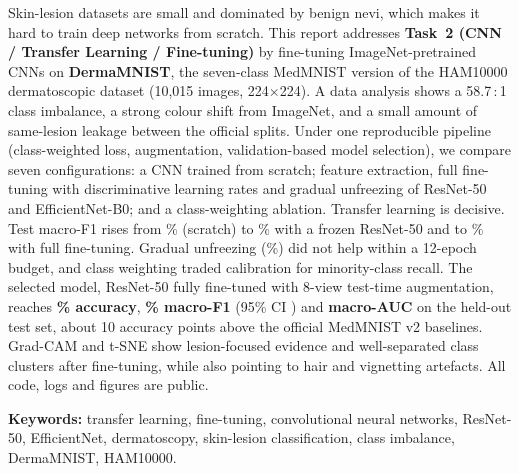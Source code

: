 Skin-lesion datasets are small and dominated by benign nevi, which makes it hard to train deep networks from
scratch. This report addresses \textbf{Task~2 (CNN / Transfer Learning / Fine-tuning)} by fine-tuning
ImageNet-pretrained CNNs on \textbf{DermaMNIST}, the seven-class MedMNIST version of the HAM10000 dermatoscopic
dataset (10{,}015 images, 224$\times$224). A data analysis shows a 58.7\,:\,1 class imbalance, a strong colour
shift from ImageNet, and a small amount of same-lesion leakage between the official splits. Under one
reproducible pipeline (class-weighted loss, augmentation, validation-based model selection), we compare seven
configurations: a CNN trained from scratch; feature extraction, full fine-tuning with discriminative learning
rates and gradual unfreezing of ResNet-50 and EfficientNet-B0; and a class-weighting ablation. Transfer learning
is decisive. Test macro-F1 rises from \ScratchFOne\% (scratch) to \RFrozenFOne\% with a frozen ResNet-50 and to
\RFineFOne\% with full fine-tuning. Gradual unfreezing (\RGradFOne\%) did not help within a 12-epoch budget, and
class weighting traded calibration for minority-class recall. The selected model, ResNet-50 fully fine-tuned with
8-view test-time augmentation, reaches \textbf{\RFineAccTTA\% accuracy}, \textbf{\RFineFOneTTA\% macro-F1}
(95\% CI \RFineFOneTTACI) and \textbf{macro-AUC \RFineAUCTTA} on the held-out test set, about 10 accuracy points
above the official MedMNIST v2 baselines. Grad-CAM and t-SNE show lesion-focused evidence and well-separated
class clusters after fine-tuning, while also pointing to hair and vignetting artefacts. All code, logs and
figures are public.

\vspace{0.3em}
\textbf{Keywords:} transfer learning, fine-tuning, convolutional neural networks, ResNet-50, EfficientNet,
dermatoscopy, skin-lesion classification, class imbalance, DermaMNIST, HAM10000.
